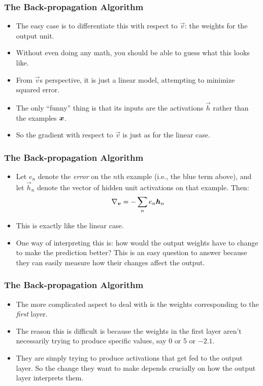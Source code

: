 \documentclass[trans]{beamer}
\begin{document}
\begin{frame}
  \frametitle{The Back-propagation Algorithm}
\begin{itemize}
\item
The easy case is to differentiate this with respect to $\vec v$: the
weights for the output unit.
\item  Without even doing any math, you should
be able to guess what this looks like.  
\item From $\vec v$s perspective, it is just a linear model, attempting
to minimize squared error. 
\item The only ``funny'' thing is that its
inputs are the activations $\vec h$ rather than the examples ${\boldsymbol{x}}$.
\item So the gradient with respect to $\vec v$ is just as for the linear
case.
\end{itemize}
\end{frame}

\begin{frame}
  \frametitle{The Back-propagation Algorithm}
\begin{itemize}
\item
Let $e_n$ denote the
\emph{error} on the $n$th example (i.e., the blue term above), and let
$\vec h_n$ denote the vector of hidden unit activations on that
example.  Then:
%
\begin{equation}
\nabla_{\boldsymbol{v}} = -\sum_n e_n \boldsymbol{h}_n 
\end{equation}
%
\item This is exactly like the linear case. 
\item  One way of interpreting this
is: how would the output weights have to change to make the prediction
better?  This is an easy question to answer because they can easily
measure how their changes affect the output.
\end{itemize}
\end{frame}

\begin{frame}
  \frametitle{The Back-propagation Algorithm}
\begin{itemize}
\item
The more complicated aspect to deal with is the weights corresponding
to the \emph{first} layer.
\item   The reason this is difficult is because
the weights in the first layer aren't necessarily trying to produce
specific values, say $0$ or $5$ or $-2.1$. 
\item They are simply trying to
produce activations that get fed to the output layer.  So the change
they want to make depends crucially on how the output layer interprets
them.
\end{itemize}
\end{frame}
\end{document}
